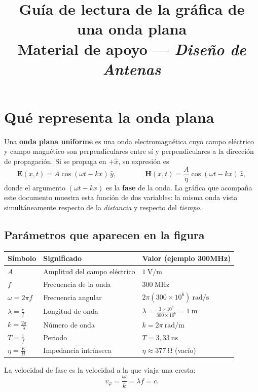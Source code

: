 \documentclass[11pt,a4paper]{article}
\title{\textbf{Guía de lectura de la gráfica de una onda plana}\\[6pt]
\large Material de apoyo — \textit{Diseño de Antenas}}
\author{}
\date{}
\begin{document}
\maketitle
\vspace{-2.5em}

\section{Qué representa la onda plana}
Una \textbf{onda plana uniforme} es una onda electromagnética cuyo campo
eléctrico y campo magnético son perpendiculares entre sí y perpendiculares a la
dirección de propagación. Si se propaga en $+\hat{x}$, su expresión es
\begin{equation}
  \mathbf{E}(x,t) = A\cos(\omega t - kx)\,\hat{y},
  \qquad\qquad
  \mathbf{H}(x,t) = \frac{A}{\eta}\cos(\omega t - kx)\,\hat{z},
  \label{eq:onda}
\end{equation}
donde el argumento $(\omega t - kx)$ es la \textbf{fase} de la onda. La gráfica
que acompaña este documento muestra esta función de dos variables: la misma
onda vista simultáneamente respecto de la \emph{distancia} y respecto del
\emph{tiempo}.

\subsection{Parámetros que aparecen en la figura}
\begin{center}
\begin{tabular}{@{}lll@{}}
\toprule
\textbf{Símbolo} & \textbf{Significado} & \textbf{Valor (ejemplo 300\si{\mega\hertz})}\\
\midrule
$A$          & Amplitud del campo eléctrico      & $1\ \si{\volt\per\metre}$\\
$f$          & Frecuencia de la onda             & $300\ \si{\mega\hertz}$\\
$\omega = 2\pi f$ & Frecuencia angular          & $2\pi(300\times10^{6})\ \si{\radian\per\second}$\\
$\lambda = \frac{c}{f}$ & Longitud de onda       & $\lambda = \frac{3\times10^{8}}{300\times10^{6}} = 1\ \si{\metre}$\\
$k = \frac{2\pi}{\lambda}$ & Número de onda     & $k = 2\pi\ \si{\radian\per\metre}$\\
$T = \frac{1}{f}$ & Periodo                     & $T = 3{,}33\ \si{\nano\second}$\\
$\eta = \frac{E}{H}$ & Impedancia intrínseca   & $\eta \approx 377\ \si{\ohm}$ (vacío)\\
\bottomrule
\end{tabular}
\end{center}
La velocidad de fase es la velocidad a la que viaja una cresta:
\begin{equation}
  v_{\varphi} = \frac{\omega}{k} = \lambda f = c.
  \label{eq:vel}
\end{equation}
\end{document}
